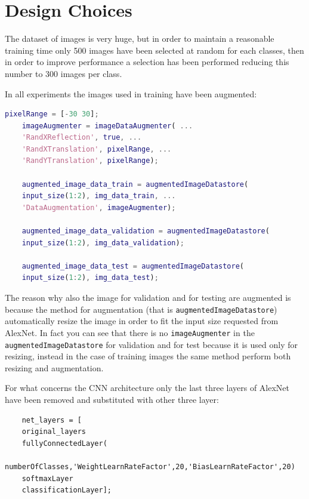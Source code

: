 \documentclass[a4paper]{report}
\begin{document}
	
	\section{Design Choices}
	\noindent The dataset of images is very huge, but in order to maintain a reasonable training time only 500 images have been selected at random for each classes, then in order to improve performance a selection has been performed reducing this number to 300 images per class.
	
	\noindent In all experiments the images used in training have been augmented:
	\begin{lstlisting}[language=Matlab]
	pixelRange = [-30 30];
	imageAugmenter = imageDataAugmenter( ...
	'RandXReflection', true, ...
	'RandXTranslation', pixelRange, ...
	'RandYTranslation', pixelRange);
	
	augmented_image_data_train = augmentedImageDatastore(
	input_size(1:2), img_data_train, ...
	'DataAugmentation', imageAugmenter);
	
	augmented_image_data_validation = augmentedImageDatastore(
	input_size(1:2), img_data_validation);
	
	augmented_image_data_test = augmentedImageDatastore(
	input_size(1:2), img_data_test);
	\end{lstlisting}

	\noindent The reason why also the image for validation and for testing are augmented is because the method for augmentation (that is \texttt{augmentedImageDatastore}) automatically resize the image in order to fit the input size requested from AlexNet. In fact you can see that there is no \texttt{imageAugmenter} in the \texttt{augmentedImageDatastore} for validation and for test because it is used only for resizing, instead in the case of training images the same method perform both resizing and augmentation.
	
	\noindent For what concerns the CNN architecture only the last three layers of AlexNet have been removed and substituted with other three layer:
	
	\begin{lstlisting}
	net_layers = [
	original_layers
	fullyConnectedLayer(
		numberOfClasses,'WeightLearnRateFactor',20,'BiasLearnRateFactor',20)
	softmaxLayer
	classificationLayer]; 
	\end{lstlisting}
\end{document}
